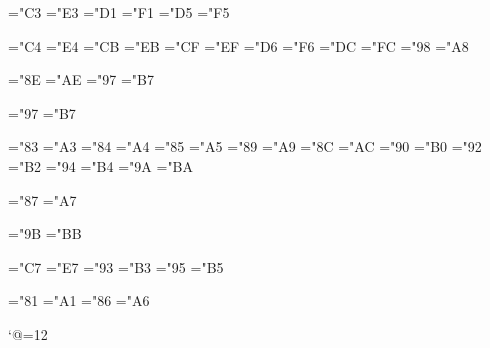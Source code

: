 \def\ec@tilde#1{{\accent"3 #1}}
\chardef\ec@tilde@A="C3
\chardef\ec@tilde@a="E3
\chardef\ec@tilde@N="D1
\chardef\ec@tilde@n="F1
\chardef\ec@tilde@O="D5
\chardef\ec@tilde@o="F5

\def\ec@dieresis#1{{\accent"4 #1}}
\chardef\ec@dieresis@A="C4
\chardef\ec@dieresis@a="E4
\chardef\ec@dieresis@E="CB
\chardef\ec@dieresis@e="EB
\chardef\ec@dieresis@I="CF
\chardef\ec@dieresis@i="EF
\chardef\ec@dieresis@O="D6
\chardef\ec@dieresis@o="F6
\chardef\ec@dieresis@U="DC
\chardef\ec@dieresis@u="FC
\chardef\ec@dieresis@Y="98
\chardef\ec@dieresis@y="A8

\def\ec@doubleacute#1{{\accent"5 #1}}
\chardef\ec@doubleacute@O="8E
\chardef\ec@doubleacute@o="AE
\chardef\ec@doubleacute@U="97
\chardef\ec@doubleacute@u="B7

\def\ec@ring#1{{\accent"6 #1}}
\chardef\ec@ring@U="97
\chardef\ec@ring@u="B7

\def\ec@caron#1{{\accent"7 #1}}
\chardef\ec@caron@C="83
\chardef\ec@caron@c="A3
\chardef\ec@caron@D="84
\chardef\ec@caron@d="A4
\chardef\ec@caron@E="85
\chardef\ec@caron@e="A5
\chardef\ec@caron@L="89
\chardef\ec@caron@l="A9
\chardef\ec@caron@N="8C
\chardef\ec@caron@n="AC
\chardef\ec@caron@R="90
\chardef\ec@caron@r="B0
\chardef\ec@caron@S="92
\chardef\ec@caron@s="B2
\chardef\ec@caron@T="94
\chardef\ec@caron@t="B4
\chardef\ec@caron@Z="9A
\chardef\ec@caron@z="BA

\def\ec@breve#1{{\accent"8 #1}}
\chardef\ec@breve@G="87
\chardef\ec@breve@g="A7

\def\ec@macron#1{{\accent"9 #1}}

\def\ec@dotabove#1{{\accent"A #1}}
\chardef\ec@dotabove@Z="9B
\chardef\ec@dotabove@z="BB

\def\ec@cedilla#1{{\setbox\z@\hbox{#1}\ifdim\ht\z@=1ex\accent"0B #1%
  \else\ooalign{\unhbox\z@\crcr\hidewidth\char"0B\hidewidth}\fi}}
\chardef\ec@cedilla@C="C7
\chardef\ec@cedilla@c="E7
\chardef\ec@cedilla@S="93
\chardef\ec@cedilla@s="B3
\chardef\ec@cedilla@T="95
\chardef\ec@cedilla@t="B5
\def\ec@cedilla@g{\accent`\`g}

\def\ec@ogonek#1{{\ooalign{\null#1\crcr\hidewidth\char"0C\hidewidth}}}
\chardef\ec@ogonek@A="81
\chardef\ec@ogonek@a="A1
\chardef\ec@ogonek@E="86
\chardef\ec@ogonek@e="A6
\def\ec@ogonek@u{{\ooalign{\null u\crcr\hidewidth\char"0C}}}

\def\b#1{{\o@lign{\relax#1\crcr\hidewidth\sh@ft{-3ex}%
  \vbox to.2ex{\hbox{\char"09}\vss}\hidewidth}}}

\def\c@talandot#1{\kern#1em\llap{$\m@th\cdot$}\kern-#1em}
\def\Lmiddledot{L\c@talandot{-.1}}
\def\lmiddledot{l\c@talandot{.15}}

\catcode`@=12

\endinput
